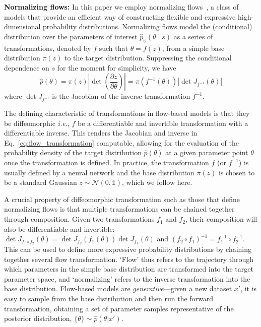 \documentclass[prd,aps,10pt,nofootinbib,twocolumn,superscriptaddress,preprintnumbers,balancelastpage,longbibliography]{revtex4-1}
\begin{document}
\noindent
\textbf{Normalizing flows:}
In this paper we employ normalizing flows~\cite{papamakarios2019normalizing,rezende2015variational}, a class of models that provide an efficient way of constructing flexible and expressive high-dimensional probability distributions. Normalizing flows model the (conditional) distribution over the parameters of interest $\hat p_\phi(\theta\mid s)$ as a series of transformations, denoted by $f$ such that $\theta = f(z)$, from a simple base distribution $\pi({z})$ to the target distribution. Suppressing the conditional dependence on $s$ for the moment for simplicity, we have
\begin{equation}
    \label{eq:flow_transformation}
\hat{p}({\theta})=\pi(z)\left|\operatorname{det}\left(\frac{\partial z}{\partial {\theta}}\right)\right|=\pi(f^{-1}({\theta}))\left|\operatorname{det}J_{f^{-1}}(\theta)\right|
\end{equation}
where $\operatorname{det}J_{f^{-1}}$ is the Jacobian of the inverse transformation $f^{-1}$.

The defining characteristic of transformations in flow-based models is that they be diffeomorphic \emph{i.e.}, $f$ be a differentiable and invertible transformation with a differentiable inverse. This renders the Jacobian and inverse in Eq.~\eqref{eq:flow_transformation} computable, allowing for the evaluation of the probability density of the target distribution $\hat{p}({\theta})$ at a given parameter point $\theta$ once the transformation is defined. In practice, the transformation $f$ (or $f^{-1}$) is usually defined by a neural network and the base distribution $\pi(z)$ is chosen to be a standard Gaussian $z\sim \mathcal N(0, \mathbb{1})$, which we follow here. 

A crucial property of diffeomorphic transformation such as those that define normalizing flows is that multiple transformations can be chained together through composition. Given two transformations $f_1$ and $f_2$, their composition will also be differentiable and invertible: $\operatorname{det}J_{f_{1}\circ f_2}(\theta) = \operatorname{det}J_{f_{2}}\left(f_1(\theta)\right)\operatorname{det}J_{f_{1}}(\theta)$ and $(f_2 \circ f_1)^{-1} = f_1^{-1} \circ f_2^{-1}$. This can be used to define more expressive probability distributions by chaining together several flow transformation. `Flow' thus refers to the trajectory through which parameters in the simple base distribution are transformed into the target parameter space, and `normalizing' refers to the inverse transformation into the base distribution. Flow-based models are \emph{generative}---given a new dataset $x'$, it is easy to sample from the base distribution and then run the forward transformation, obtaining a set of parameter samples representative of the posterior distribution, $\{\theta\}\sim\hat p(\theta|x')$.
\end{document}
